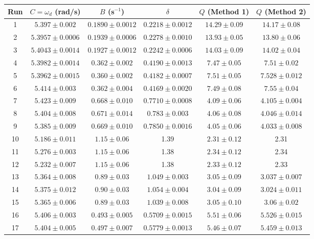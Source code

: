 \begin{table}[h]
\centering
\small
\begin{tabular}{c c c c c c}
\toprule
Run & $C=\omega_d$ (rad/s) & $B$ (s$^{-1}$) & $\delta$ & $Q$ (Method 1) & $Q$ (Method 2) \\
\midrule
1 & $5.397 \pm 0.002$ & $0.1890 \pm 0.0012$ & $0.2218 \pm 0.0012$ & $14.29 \pm 0.09$ & $14.17 \pm 0.08$ \\
2 & $5.3957 \pm 0.0006$ & $0.1939 \pm 0.0006$ & $0.2278 \pm 0.0010$ & $13.93 \pm 0.05$ & $13.80 \pm 0.06$ \\
3 & $5.4043 \pm 0.0014$ & $0.1927 \pm 0.0012$ & $0.2242 \pm 0.0006$ & $14.03 \pm 0.09$ & $14.02 \pm 0.04$ \\
4 & $5.3982 \pm 0.0014$ & $0.362 \pm 0.002$ & $0.4190 \pm 0.0013$ & $7.47 \pm 0.05$ & $7.51 \pm 0.02$ \\
5 & $5.3962 \pm 0.0015$ & $0.360 \pm 0.002$ & $0.4182 \pm 0.0007$ & $7.51 \pm 0.05$ & $7.528 \pm 0.012$ \\
6 & $5.414 \pm 0.003$ & $0.362 \pm 0.004$ & $0.4169 \pm 0.0020$ & $7.49 \pm 0.08$ & $7.55 \pm 0.04$ \\
7 & $5.423 \pm 0.009$ & $0.668 \pm 0.010$ & $0.7710 \pm 0.0008$ & $4.09 \pm 0.06$ & $4.105 \pm 0.004$ \\
8 & $5.404 \pm 0.008$ & $0.671 \pm 0.014$ & $0.783 \pm 0.003$ & $4.06 \pm 0.08$ & $4.046 \pm 0.014$ \\
9 & $5.385 \pm 0.009$ & $0.669 \pm 0.010$ & $0.7850 \pm 0.0016$ & $4.05 \pm 0.06$ & $4.033 \pm 0.008$ \\
10 & $5.186 \pm 0.011$ & $1.15 \pm 0.06$ & 1.39 & $2.31 \pm 0.12$ & 2.31 \\
11 & $5.276 \pm 0.003$ & $1.15 \pm 0.06$ & 1.38 & $2.34 \pm 0.12$ & 2.34 \\
12 & $5.232 \pm 0.007$ & $1.15 \pm 0.06$ & 1.38 & $2.33 \pm 0.12$ & 2.33 \\
13 & $5.364 \pm 0.008$ & $0.89 \pm 0.03$ & $1.049 \pm 0.003$ & $3.05 \pm 0.09$ & $3.037 \pm 0.007$ \\
14 & $5.375 \pm 0.012$ & $0.90 \pm 0.03$ & $1.054 \pm 0.004$ & $3.04 \pm 0.09$ & $3.024 \pm 0.011$ \\
15 & $5.365 \pm 0.006$ & $0.89 \pm 0.03$ & $1.039 \pm 0.008$ & $3.05 \pm 0.10$ & $3.06 \pm 0.02$ \\
16 & $5.406 \pm 0.003$ & $0.493 \pm 0.005$ & $0.5709 \pm 0.0015$ & $5.51 \pm 0.06$ & $5.526 \pm 0.015$ \\
17 & $5.404 \pm 0.005$ & $0.497 \pm 0.007$ & $0.5779 \pm 0.0013$ & $5.46 \pm 0.07$ & $5.459 \pm 0.013$ \\

\end{tabular}
\end{table}
